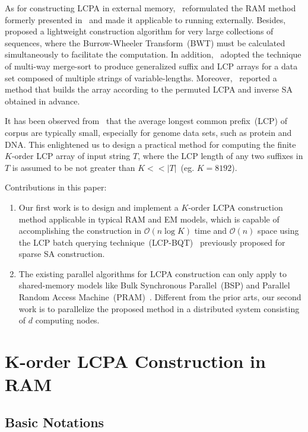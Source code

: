 \documentclass{llncs}
\begin{document}
As for constructing {LCPA} in external memory,~\cite{Bingmann-Code12} reformulated the {RAM} method formerly presented in~\cite{Fischer11} and made it applicable to running externally. Besides,~\cite{Markus2012} proposed a lightweight construction algorithm for very large collections of sequences, where the Burrow-Wheeler Transform~(BWT) must be calculated simultaneously to facilitate the computation. In addition,~\cite{Felipe2013} adopted the technique of multi-way merge-sort to produce generalized suffix and {LCP} arrays for a data set composed of multiple strings of variable-lengths. Moreover,~\cite{Juha2014} reported a method that builds the array according to the permuted {LCPA} and inverse {SA} obtained in advance.

It has been observed from~\cite{Felipe2013} that the average longest common prefix~({LCP}) of corpus are typically small, especially for genome data sets, such as protein and {DNA}. This enlightened us to design a practical method for computing the finite $K$-order {LCP} array of input string $T$, where the {LCP} length of any two suffixes in $T$ is assumed to be not greater than $K<<|T|$~(eg. $K=8192$).

Contributions in this paper:
\begin{enumerate}
\item Our first work is to design and implement a $K$-order {LCPA} construction method applicable in typical {RAM} and {EM} models, which is capable of accomplishing the construction in $\mathcal{O}(n\log K)$ time and $\mathcal{O}(n)$ space using the {LCP} batch querying technique~({LCP-BQT})~\cite{Philip2013} previously proposed for sparse SA construction.
\item The existing parallel algorithms for {LCPA} construction can only apply to shared-memory models like Bulk Synchronous Parallel~({BSP}) and Parallel Random Access Machine~({PRAM})~\cite{Shun2014,Deo2013}. Different from the prior arts, our second work is to parallelize the proposed method in a distributed system consisting of $d$ computing nodes.
\end{enumerate}

\section{K-order LCPA Construction in RAM}\label{sec:construction_in_ram}

\subsection{Basic Notations}\label{subsec:basic_notations}
\end{document}
